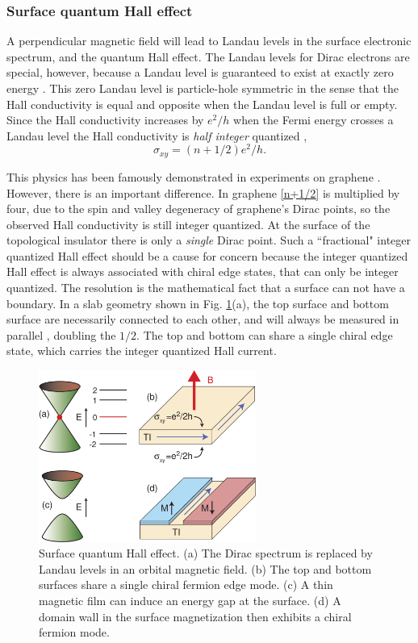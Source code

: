 \documentclass[twocolumn,floatfix,showpacs,rmp,aps]{revtex4}
\begin{document}
	\subsubsection{Surface quantum Hall effect}
	\label{sec:surfaceqhe}
	
	A perpendicular magnetic field will lead to Landau levels in the
	surface electronic spectrum, and the quantum Hall effect.
	The Landau levels for Dirac electrons
	are special, however, because a Landau level is guaranteed to exist
	at exactly zero energy \cite{jackiw84}.  This zero Landau level is particle-hole symmetric
	in the sense that the Hall conductivity is equal and opposite when the
	Landau level is full or empty.  Since the Hall conductivity increases by
	$e^2/h$ when the Fermi energy crosses a Landau level
	the Hall conductivity is {\it half integer} quantized \cite{ando02},
	\begin{equation}
		\sigma_{xy} = (n+1/2) e^2/h.
		\label{n+1/2}
	\end{equation}
	
	This physics has been famously demonstrated in experiments on
	graphene \cite{novoselov05,zhangy05}.  However, there is an important difference.  In graphene
	\eqref{n+1/2} is multiplied by four, due to the spin and valley degeneracy
	of graphene's Dirac points, so the observed Hall conductivity is
	still integer quantized.  At the surface of the topological
	insulator there is only a {\it single} Dirac point.  Such a
	``fractional" integer quantized Hall effect should be a cause for
	concern because the integer quantized Hall effect is always
	associated with chiral edge states, that can only be integer
	quantized.  The resolution is the mathematical fact
	that a surface can not have
	a boundary.  In a slab geometry shown in Fig. \ref{fig:surfaceqhe}(a), the
	top surface and bottom surface are necessarily connected to each other, and will
	always be measured in parallel \cite{fukane07}, doubling the $1/2$.  The top and
	bottom can share a single chiral edge state, which carries the integer
	quantized Hall current.
	
	\begin{figure}
		\includegraphics[width=2.8in]{Fig18}
		\caption{Surface quantum Hall effect.  (a) The Dirac spectrum is replaced by Landau levels
			in an orbital magnetic field.  (b) The top and bottom surfaces share a single chiral fermion
			edge mode.  (c) A thin magnetic film can induce an energy gap at the surface.
			(d) A domain wall in the surface magnetization then exhibits a chiral fermion mode.}
		\label{fig:surfaceqhe}
	\end{figure}
	
\end{document}
